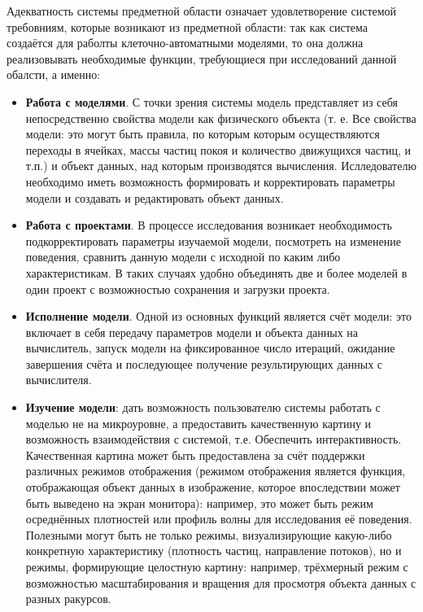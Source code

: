 \documentclass[a4paper,12pt]{extarticle}
\begin{document}
Адекватность системы предметной области означает удовлетворение системой требовниям, которые возникают из предметной области: так как система создаётся для раболты клеточно-автоматными моделями, то она должна реализовывать необходимые функции, требующиеся при исследований данной обалсти, а именно:
\begin{itemize}
    \item \textbf{Работа с моделями}. 
        С точки зрения системы модель представляет из себя непосредственно свойства модели как физического объекта (т. е. Все свойства модели: это могут быть правила, по которым которым осуществляются переходы в ячейках, массы частиц покоя и количество движущихся частиц, и т.п.) и объект данных, над которым производятся вычисления. Ислледователю необходимо иметь возможность формировать и корректировать параметры модели и создавать и редактировать объект данных.
        
    \item \textbf{Работа с проектами}. 
        В процессе исследования возникает необходимость подкорректировать параметры изучаемой модели, посмотреть на изменение поведения, сравнить данную модели с исходной по каким либо характеристикам. В таких случаях удобно объединять две и более моделей в один проект с возможностью сохранения и загрузки проекта.
        
    \item \textbf{Исполнение модели}. 
        Одной из основных функций является счёт модели: это включает в себя передачу параметров модели и объекта данных на вычислитель, запуск модели на фиксированное число итераций, ожидание завершения счёта и последующее получение результирующих данных с вычислителя. 
        
    \item \textbf{Изучение модели}: 
        дать возможность пользователю системы работать с моделью не на микроуровне, а предоставить качественную картину и возможность взаимодействия с системой, т.е. Обеспечить интерактивность. Качественная картина может быть предоставлена за счёт поддержки различных режимов отображения (режимом отображения является функция, отображающая объект данных в изображение, которое впоследствии может быть выведено на экран монитора): например, это может быть режим осреднённых плотностей или профиль волны для исследования её поведения. Полезными могут быть не только режимы, визуализирующие какую-либо конкретную характеристику (плотность частиц, направление потоков), но и режимы, формирующие целостную картину: например, трёхмерный режим с возможностью масштабирования и вращения для просмотря объекта данных с разных ракурсов.
        

\end{itemize}
\end{document}
